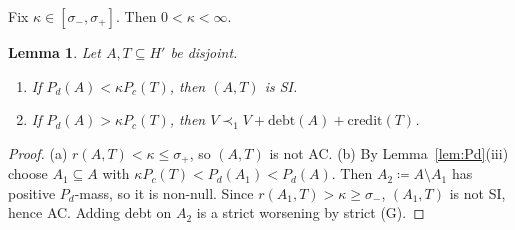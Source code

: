 \documentclass[11pt]{article}
\newtheorem{lemma}[theorem]{Lemma}
\theoremstyle{definition}\newtheorem{definition}[theorem]{Definition}
\theoremstyle{remark}\newtheorem{remark}[theorem]{Remark}
\newcommand{\debt}{\mathrm{debt}}
\newcommand{\cred}{\mathrm{credit}}
\begin{document}
Fix $\kappa\in[\sigma_-,\sigma_+]$. Then $0<\kappa<\infty$.

\begin{lemma}\label{lem:kappa}
Let $A,T\subseteq H'$ be disjoint.
\begin{enumerate}[label=(\alph*)]
\item If $P_d(A)<\kappa P_c(T)$, then $(A,T)$ is SI.
\item If $P_d(A)>\kappa P_c(T)$, then $V\prec_1V+\debt(A)+\cred(T)$.
\end{enumerate}
\end{lemma}
\begin{proof}
(a) $r(A,T)<\kappa\le\sigma_+$, so $(A,T)$ is not AC. (b) By
Lemma~\ref{lem:Pd}(iii) choose $A_1\subseteq A$ with
$\kappa P_c(T)<P_d(A_1)<P_d(A)$. Then $A_2\coloneqq A\setminus A_1$ has
positive $P_d$-mass, so it is non-null. Since $r(A_1,T)>\kappa\ge\sigma_-$,
$(A_1,T)$ is not SI, hence AC. Adding debt on $A_2$ is a strict worsening by
strict (G).
\end{proof}
\end{document}
